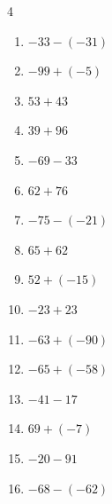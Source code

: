 \begin{multicols}{4}
\begin{enumerate}
        \phantom{$=152$}

  \item $-33-(-31)$

        \phantom{$=-2$}

  \item $-99+(-5)$

        \phantom{$=-104$}

  \item $53+43$

        \phantom{$=96$}

  \item $39+96$

        \phantom{$=135$}

  \item $-69-33$

        \phantom{$=-102$}

  \item $62+76$

        \phantom{$=138$}

  \item $-75-(-21)$

        \phantom{$=-54$}

  \item $65+62$

        \phantom{$=127$}

  \item $52+(-15)$

        \phantom{$=37$}

  \item $-23+23$

        \phantom{$=0$}

  \item $-63+(-90)$

        \phantom{$=-153$}

  \item $-65+(-58)$

        \phantom{$=-123$}

  \item $-41-17$

        \phantom{$=-58$}

  \item $69+(-7)$

        \phantom{$=62$}

  \item $-20-91$

        \phantom{$=-111$}

  \item $-68-(-62)$


\end{enumerate}
\end{multicols}
